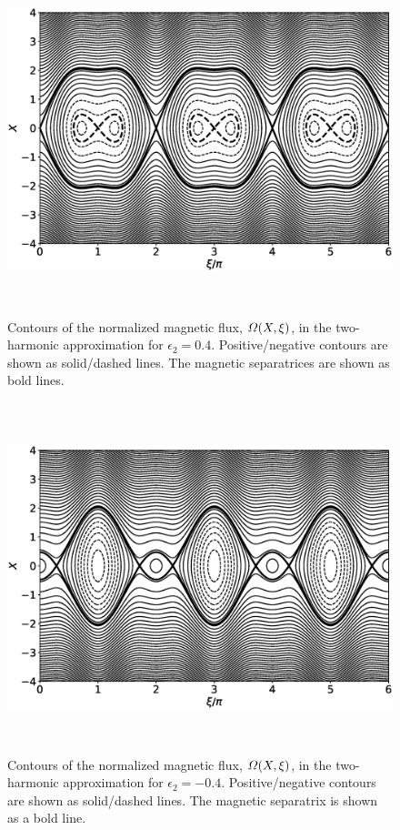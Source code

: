\documentclass[12pt,prb,aps]{revtex4-1}
\begin{document}
\begin{figure}
\centerline{\includegraphics[height=4in]{Figure3.eps}}
\caption{Contours of the normalized magnetic flux, ${\mit\Omega}(X,\xi)$, in the two-harmonic approximation for 
$\epsilon_2=0.4$. Positive/negative contours are shown as solid/dashed lines. The magnetic separatrices are shown
as  bold lines.}\label{fig3}
\end{figure}

\begin{figure}
\centerline{\includegraphics[height=4in]{Figure4.eps}}
\caption{Contours of the normalized magnetic flux, ${\mit\Omega}(X,\xi)$, in the two-harmonic approximation for 
$\epsilon_2=-0.4$. Positive/negative contours are shown as solid/dashed lines. The magnetic separatrix is shown
as a  bold line.}\label{fig4}
\end{figure}
\end{document}
